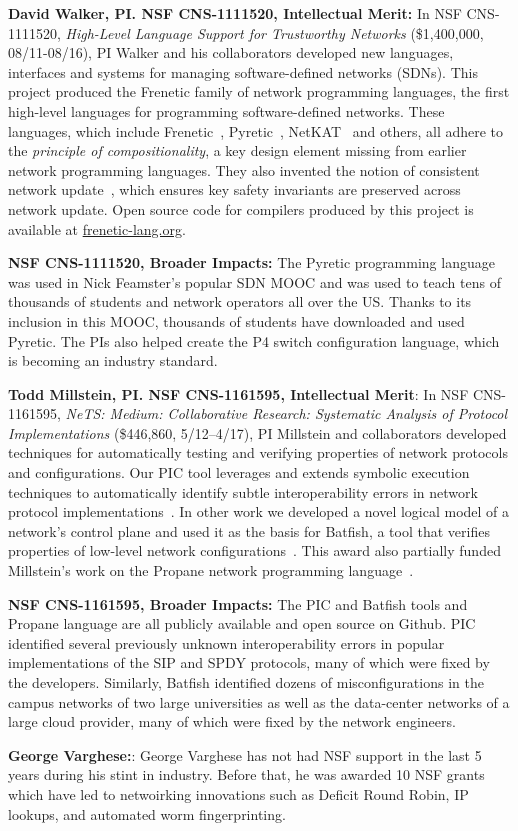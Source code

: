 \noindent
{\bf David Walker, PI. NSF CNS-1111520, Intellectual Merit:}
In NSF CNS-1111520, \emph{High-Level Language Support for Trustworthy Networks}
(\$1,400,000, 08/11-08/16),
PI Walker and his collaborators developed new languages, interfaces
and systems for managing software-defined networks (SDNs).  
This project produced the Frenetic family
of network programming languages, the first high-level languages for
programming software-defined networks.  These languages, which include
Frenetic~\cite{frenetic}, 
Pyretic~\cite{pyretic},
NetKAT~\cite{netkat} and others, all adhere to the
\emph{principle of compositionality}, a key design element missing
from earlier network programming languages.  They also invented the
notion of consistent network update~\cite{reitblatt+:consistent-updates},
which ensures key safety invariants are preserved across network update.
Open source code for compilers produced by this project is available
at \url{frenetic-lang.org}.

\noindent
{\bf NSF CNS-1111520, Broader Impacts:} 
The Pyretic programming language was used in Nick Feamster's popular
SDN MOOC and was used to teach tens of thousands of students and
network operators all over the US.  Thanks to its inclusion in this
MOOC, thousands of students have downloaded and used Pyretic.  The PIs
also helped create the P4 switch configuration language, which is
becoming an industry standard.

\medskip
\noindent
{\bf Todd Millstein, PI. NSF CNS-1161595, Intellectual Merit}: In NSF CNS-1161595, {\em NeTS: Medium: Collaborative Research: Systematic Analysis of Protocol Implementations} (\$446,860, 5/12--4/17), PI Millstein and collaborators developed techniques for automatically testing and verifying properties of network protocols and configurations.  Our PIC tool leverages and extends symbolic execution techniques to automatically identify subtle interoperability errors in network protocol implementations~\cite{DBLP:conf/nsdi/PedrosaFKGMM15}.  In other work we developed a novel logical model of a network's control plane and used it as the basis for Batfish, a tool that verifies properties of low-level network configurations~\cite{batfish}.  This award also partially funded Millstein's work on the Propane network programming language~\cite{beckett+:propane}. 

\noindent
{\bf NSF CNS-1161595, Broader Impacts:} The PIC and Batfish tools and Propane language are all publicly available and open source on Github.  PIC identified several previously unknown interoperability errors in popular implementations of the SIP and SPDY protocols, many of which were fixed by the developers.  Similarly, Batfish identified dozens of misconfigurations in the campus networks of two large universities as well as the data-center networks of a large cloud provider, many of which were fixed by the network engineers.

{\bf George Varghese:}: George Varghese has not had NSF support in the last 5 years during his stint in industry.  Before that, he was awarded 10 NSF grants which have led to netwoirking innovations such as Deficit Round Robin, IP lookups, and automated worm fingerprinting.

